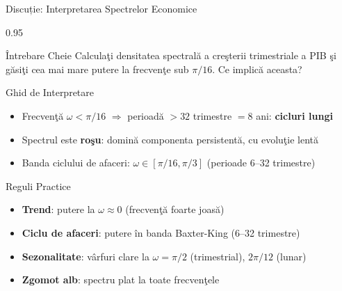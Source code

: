 \documentclass[9pt, aspectratio=169, t]{beamer}
\begin{document}
\begin{frame}{Discuție: Interpretarea Spectrelor Economice}
    \begin{cminipage}{0.95\textwidth}
    \vspace{-0.3cm}
    {\small
    \begin{alertblock}{Întrebare Cheie}
        Calculaţi densitatea spectrală a creşterii trimestriale a PIB şi găsiţi cea mai mare putere la frecvenţe sub $\pi/16$. Ce implică aceasta?
    \end{alertblock}
    \begin{block}{Ghid de Interpretare}
        \begin{itemize}\setlength{\itemsep}{0pt}
            \item Frecvenţă $\omega < \pi/16$ $\Rightarrow$ perioadă $> 32$ trimestre $= 8$ ani: \textbf{cicluri lungi}
            \item Spectrul este \textbf{roşu}: domină componenta persistentă, cu evoluţie lentă
            \item Banda ciclului de afaceri: $\omega \in [\pi/16, \pi/3]$ (perioade 6--32 trimestre)
        \end{itemize}
    \end{block}
    \begin{exampleblock}{Reguli Practice}
        \begin{itemize}\setlength{\itemsep}{0pt}
            \item \textbf{Trend}: putere la $\omega \approx 0$ (frecvenţă foarte joasă)
            \item \textbf{Ciclu de afaceri}: putere în banda Baxter-King (6--32 trimestre)
            \item \textbf{Sezonalitate}: vârfuri clare la $\omega = \pi/2$ (trimestrial), $2\pi/12$ (lunar)
            \item \textbf{Zgomot alb}: spectru plat la toate frecvenţele
        \end{itemize}
    \end{exampleblock}
    }
    \end{cminipage}
\end{frame}
\end{document}
